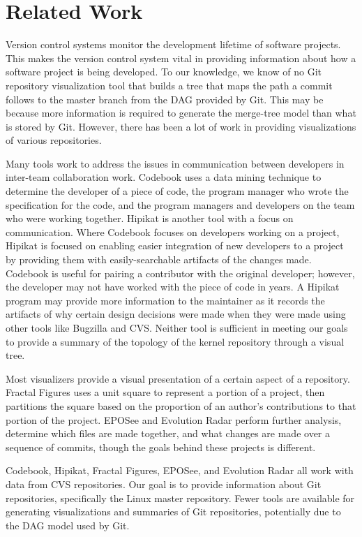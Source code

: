 \documentclass[conference, draftclsnofoot, draft]{IEEEtran}
\begin{document}
\section{Related Work}

Version control systems monitor the development lifetime of software projects. This
makes the version control system vital in providing information about how a software
project is being developed. To our knowledge, we know of no Git repository
visualization tool that builds a tree that maps the path a commit follows to the
master branch from the DAG provided by Git. This may be because more information is
required to generate the merge-tree model than what is stored by Git. However, there
has been a lot of work in providing visualizations of various repositories.

Many tools work to address the issues in communication between developers in
inter-team collaboration work. Codebook \cite{Begel2010} uses a data mining
technique  to determine the developer of a piece of code, the program manager who
wrote the specification for the code, and the program managers and developers on the
team who were working together. Hipikat\cite{Cubranic2005} is another tool with a
focus on communication. Where Codebook focuses on developers working on a project,
Hipikat is focused on enabling easier integration of new developers to a project by
providing them with easily-searchable artifacts of the changes made. Codebook is
useful for pairing a contributor with the original developer; however, the developer
may not have worked with the piece of code in years. A Hipikat program may provide
more information to the maintainer as it records the artifacts of why certain
design decisions were made when they were made using other tools like Bugzilla and
CVS. Neither tool is sufficient in meeting our goals to provide a summary of the
topology of the kernel repository through a visual tree.

Most visualizers provide a visual presentation of a certain aspect of a repository.
Fractal Figures \cite{Ambros2005} uses a unit square to represent a portion of a
project, then partitions the square based on the proportion of an author's
contributions to that portion of the project. EPOSee\cite{Burch2005} and Evolution
Radar\cite{Ambros2009} perform further analysis, determine which files are made
together, and what changes are made over a sequence of commits, though the goals
behind these projects is different.

Codebook, Hipikat, Fractal Figures, EPOSee, and Evolution Radar all work with data
from CVS repositories. Our goal is to provide information about Git repositories,
specifically the Linux master repository. Fewer tools are available for generating
visualizations and summaries of Git repositories, potentially due to the DAG model
used by Git.
\end{document}
